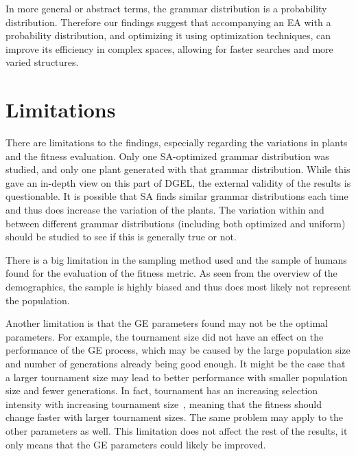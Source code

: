 In more general or abstract terms, the grammar distribution is a probability distribution.
Therefore our findings suggest that accompanying an \gls{EA} with a probability distribution, and optimizing it using optimization techniques, can improve its efficiency in complex spaces, allowing for faster searches and more varied structures.



\section{Limitations}
There are limitations to the findings, especially regarding the variations in plants and the fitness evaluation.
Only one \gls{SA}-optimized grammar distribution was studied, and only one plant generated with that grammar distribution.
While this gave an in-depth view on this part of \gls{DGEL}, the external validity of the results is questionable.
It is possible that \gls{SA} finds similar grammar distributions each time and thus does increase the variation of the plants.
The variation within and between different grammar distributions (including both optimized and uniform) should be studied to see if this is generally true or not.

There is a big limitation in the sampling method used and the sample of humans found for the evaluation of the fitness metric.
As seen from the overview of the demographics, the sample is highly biased and thus does most likely not represent the population.

Another limitation is that the \gls{GE} parameters found may not be the optimal parameters.
For example, the tournament size did not have an effect on the performance of the \gls{GE} process, which may be caused by the large population size and number of generations already being good enough.
It might be the case that a larger tournament size may lead to better performance with smaller population size and fewer generations.
In fact, tournament has an increasing selection intensity with increasing tournament size~\cite{1995Blickle}, meaning that the fitness should change faster with larger tournament sizes.
The same problem may apply to the other parameters as well.
This limitation does not affect the rest of the results, it only means that the \gls{GE} parameters could likely be improved.

